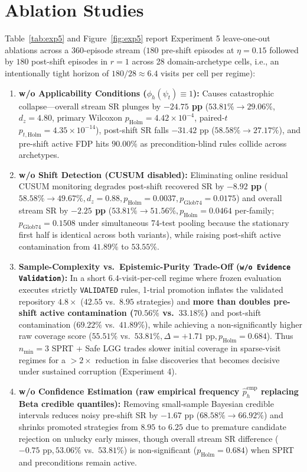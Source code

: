 \documentclass[10pt,letterpaper]{article}
\begin{document}
\section{Ablation Studies}
Table~\ref{tab:exp5} and Figure~\ref{fig:exp5} report Experiment 5 leave-one-out ablations across a 360-episode stream ($180$ pre-shift episodes at $\eta=0.15$ followed by $180$ post-shift episodes in $r=1$ across 28 domain-archetype cells, i.e., an intentionally tight horizon of $180/28 \approx 6.4$ visits per cell per regime):
\begin{enumerate}
  \item \textbf{w/o Applicability Conditions ($\phi_h(\psi_t) \equiv 1$):} Causes catastrophic collapse—overall stream SR plunges by \textbf{$-24.75$ pp} ($53.81\% \to 29.06\%$, $d_z = 4.80$, primary Wilcoxon $p_{\mathrm{Holm}} = 4.42 \times 10^{-4}$, paired-$t$ $p_{t,\mathrm{Holm}} = 4.35 \times 10^{-14}$), post-shift SR falls $-31.42\text{ pp}$ ($58.58\% \to 27.17\%$), and pre-shift active FDP hits $90.00\%$ as precondition-blind rules collide across archetypes.
  \item \textbf{w/o Shift Detection (CUSUM disabled):} Eliminating online residual CUSUM monitoring degrades post-shift recovered SR by \textbf{$-8.92$ pp} ($58.58\% \to 49.67\%, d_z = 0.88, p_{\mathrm{Holm}} = 0.0037, p_{\mathrm{Glob74}} = 0.0175$) and overall stream SR by \textbf{$-2.25$ pp} ($53.81\% \to 51.56\%, p_{\mathrm{Holm}} = 0.0464$ per-family; $p_{\mathrm{Glob74}} = 0.1508$ under simultaneous 74-test pooling because the stationary first half is identical across both variants), while raising post-shift active contamination from $41.89\%$ to $53.55\%$.
  \item \textbf{Sample-Complexity vs.\ Epistemic-Purity Trade-Off (\texttt{w/o Evidence Validation}):} In a short $6.4$-visit-per-cell regime where frozen evaluation executes strictly \texttt{VALIDATED} rules, 1-trial promotion inflates the validated repository $4.8\times$ ($42.55$ vs.\ $8.95$ strategies) and \textbf{more than doubles pre-shift active contamination ($70.56\%$ vs.\ $33.18\%$)} and post-shift contamination ($69.22\%$ vs.\ $41.89\%$), while achieving a non-significantly higher raw coverage score ($55.51\%$ vs.\ $53.81\%, \Delta = +1.71\text{ pp}, p_{\mathrm{Holm}} = 0.684$). Thus $n_{\min}=3$ SPRT + Safe LGG trades slower initial coverage in sparse-visit regimes for a $>2\times$ reduction in false discoveries that becomes decisive under sustained corruption (Experiment 4).
  \item \textbf{w/o Confidence Estimation (raw empirical frequency $\hat{p}_h^{\mathrm{emp}}$ replacing Beta credible quantiles):} Removing small-sample Bayesian credible intervals reduces noisy pre-shift SR by $-1.67\text{ pp}$ ($68.58\% \to 66.92\%$) and shrinks promoted strategies from $8.95$ to $6.25$ due to premature candidate rejection on unlucky early misses, though overall stream SR difference ($-0.75\text{ pp}, 53.06\%$ vs.\ $53.81\%$) is non-significant ($p_{\mathrm{Holm}}=0.684$) when SPRT and preconditions remain active.

\end{enumerate}
\end{document}
